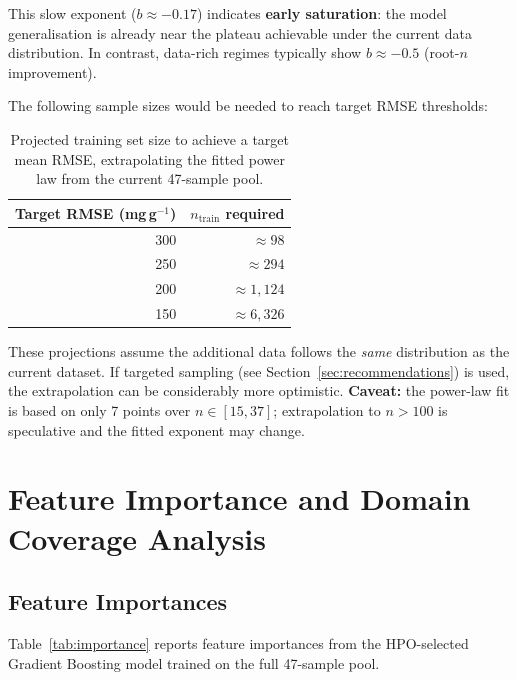 \documentclass[12pt,a4paper]{article}
\begin{document}
This slow exponent ($b \approx -0.17$) indicates \textbf{early saturation}:
the model generalisation is already near the plateau achievable under the
current data distribution.  In contrast, data-rich regimes typically show
$b \approx -0.5$ (root-$n$ improvement).

The following sample sizes would be needed to reach target RMSE thresholds:

\begin{table}[h]
\centering
\caption{Projected training set size to achieve a target mean RMSE,
  extrapolating the fitted power law from the current 47-sample pool.}
\label{tab:projection}
\begin{tabular}{rr}
\toprule
Target RMSE (mg\,g$^{-1}$) & $n_\text{train}$ required \\
\midrule
300  & $\approx 98$ \\
250  & $\approx 294$ \\
200  & $\approx 1{,}124$ \\
150  & $\approx 6{,}326$ \\
\bottomrule
\end{tabular}
\end{table}

These projections assume the additional data follows the \emph{same}
distribution as the current dataset.  If targeted sampling (see
Section~\ref{sec:recommendations}) is used, the extrapolation can be
considerably more optimistic.  \textbf{Caveat:} the power-law fit is
based on only 7 points over $n \in [15, 37]$; extrapolation to
$n > 100$ is speculative and the fitted exponent may change.

\section{Feature Importance and Domain Coverage Analysis}
\label{sec:features}

\subsection{Feature Importances}

Table~\ref{tab:importance} reports feature importances from the HPO-selected
Gradient Boosting model trained on the full 47-sample pool.
\end{document}
